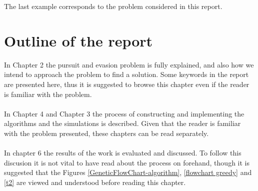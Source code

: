 The last example corresponds to the problem considered in this report.
\section{Outline of the report}
In Chapter 2 the pursuit and evasion problem is fully explained, and also how we intend to approach the problem to find a solution. Some keywords in the report are presented here, thus it is suggested to browse this chapter even if the reader is familiar with the problem.\\
\\In Chapter 4 and Chapter 3 the process of constructing and implementing the algorithms and the simulations is described. Given that the reader is familiar with the problem presented, these chapters can be read separately.\\
\\In chapter 6 the results of the work is evaluated and discussed. To follow this discusion it is not vital to have read about the process on forehand, though it is suggested that the Figures \ref{GeneticFlowChart-algorithm}, \ref{flowchart greedy} and \ref{t2} are viewed and understood before reading this chapter.



